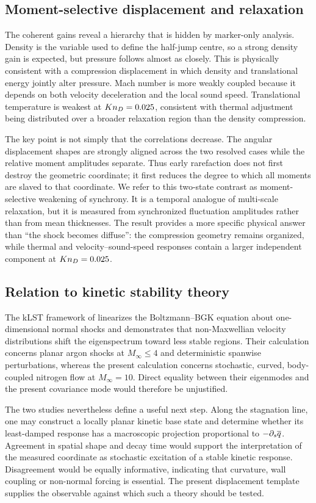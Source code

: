 \subsection{Moment-selective displacement and relaxation}
The coherent gains reveal a hierarchy that is hidden by marker-only analysis. Density is the variable used to define the half-jump centre, so a strong density gain is expected, but pressure follows almost as closely. This is physically consistent with a compression displacement in which density and translational energy jointly alter pressure. Mach number is more weakly coupled because it depends on both velocity deceleration and the local sound speed. Translational temperature is weakest at $Kn_D=0.025$, consistent with thermal adjustment being distributed over a broader relaxation region than the density compression.

The key point is not simply that the correlations decrease. The angular displacement shapes are strongly aligned across the two resolved cases while the relative moment amplitudes separate. Thus early rarefaction does not first destroy the geometric coordinate; it first reduces the degree to which all moments are slaved to that coordinate. We refer to this two-state contrast as moment-selective weakening of synchrony. It is a temporal analogue of multi-scale relaxation, but it is measured from synchronized fluctuation amplitudes rather than from mean thicknesses. The result provides a more specific physical answer than ``the shock becomes diffuse'': the compression geometry remains organized, while thermal and velocity--sound-speed responses contain a larger independent component at $Kn_D=0.025$.

\subsection{Relation to kinetic stability theory}
The kLST framework of \citet{Karpuzcu2026} linearizes the Boltzmann--BGK equation about one-dimensional normal shocks and demonstrates that non-Maxwellian velocity distributions shift the eigenspectrum toward less stable regions. Their calculation concerns planar argon shocks at $M_\infty\leq4$ and deterministic spanwise perturbations, whereas the present calculation concerns stochastic, curved, body-coupled nitrogen flow at $M_\infty=10$. Direct equality between their eigenmodes and the present covariance mode would therefore be unjustified.

The two studies nevertheless define a useful next step. Along the stagnation line, one may construct a locally planar kinetic base state and determine whether its least-damped response has a macroscopic projection proportional to $-\partial_s\overline{q}$. Agreement in spatial shape and decay time would support the interpretation of the measured coordinate as stochastic excitation of a stable kinetic response. Disagreement would be equally informative, indicating that curvature, wall coupling or non-normal forcing is essential. The present displacement template supplies the observable against which such a theory should be tested.

